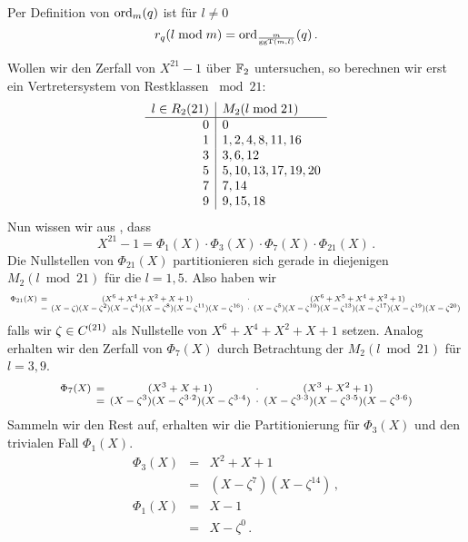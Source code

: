 \begin{bemerkung}
  Per Definition von $\operatorname{ord}_m(q)$ ist für $l\neq 0$
  \[ r_q(l\bmod m) = \operatorname{ord}_{\frac{m}{\operatorname{ggT}(m,l)}}(q)\,. \]
\end{bemerkung}


\begin{beispiel}
  \label{beispiel:zerfall_x21_1_1}
  Wollen wir den Zerfall von $X^{21}-1$ über $\mathbb{F}_2$ untersuchen, so berechnen
  wir erst ein Vertretersystem von Restklassen $\bmod{21}$:
  \[\begin{array}[t]{r|l}
    l \in R_2(21) & M_2(l \bmod{21}) \\\hline
    0 & 0 \\
    1 & 1, 2, 4, 8, 11, 16 \\
    3 & 3, 6, 12 \\
    5 & 5, 10, 13, 17, 19, 20 \\
    7 & 7, 14 \\
    9 & 9, 15, 18
  \end{array}\]
  Nun wissen wir aus , dass 
  \[ X^{21} -1 = \Phi_1(X) \cdot \Phi_3(X) \cdot \Phi_7(X) \cdot
  \Phi_{21}(X)\,.\]
  Die Nullstellen von $\Phi_{21}(X)$ partitionieren sich gerade in
  diejenigen $M_2(l\bmod{21})$ für die $l=1,5$.
  Also haben wir 
  \[\footnotesize\setlength{\arraycolsep}{2pt}\everymath{\displaystyle}
    \begin{array}{rcccc} 
      \Phi_{21}(X) &=& (X^{6} + X^{4} + X^{2} + X + 1) 
        &\cdot& (X^{6} + X^{5} + X^{4} + X^{2} + 1) \\
      &=& (X-\zeta)(X-\zeta^2)(X-\zeta^4)(X-\zeta^8)(X-\zeta^{11})
        (X-\zeta^{16}) &\cdot&
        (X-\zeta^5)(X-\zeta^{10})(X-\zeta^{13})(X-\zeta^{17})
        (X-\zeta^{19})(X-\zeta^{20})\,
    \end{array}\]
  falls wir $\zeta \in C^{(21)}$ als Nullstelle von
  $X^6+X^4+X^2+X+1$ setzen.
  Analog erhalten wir den Zerfall von $\Phi_7(X)$ durch Betrachtung der
  $M_2(l\bmod{21})$ für $l=3,9$. 
  \[\footnotesize\setlength{\arraycolsep}{2pt}\everymath{\displaystyle}
    \begin{array}{rcccc} 
      \Phi_7(X)&=& (X^{3} + X + 1) &\cdot& (X^{3} + X^{2} + 1) \\
      &=& (X-\zeta^3)(X-\zeta^{3\cdot 2})(X-\zeta^{3\cdot 4}) &\cdot&
        (X-\zeta^{3\cdot 3})(X-\zeta^{3\cdot 5})(X-\zeta^{3\cdot 6}) 
    \end{array}\]
  Sammeln wir den Rest auf, erhalten wir die Partitionierung für
  $\Phi_3(X)$ und den trivialen Fall $\Phi_1(X)$.
  \[ \begin{array}{rcc} 
    \Phi_3(X) &=& X^2 + X + 1\\
              &=& (X-\zeta^7)(X-\zeta^{14})\,,\\[10pt]
    \Phi_1(X) &=& X-1\\
             &=& X-\zeta^0\,.
    \end{array}\]
\end{beispiel}


